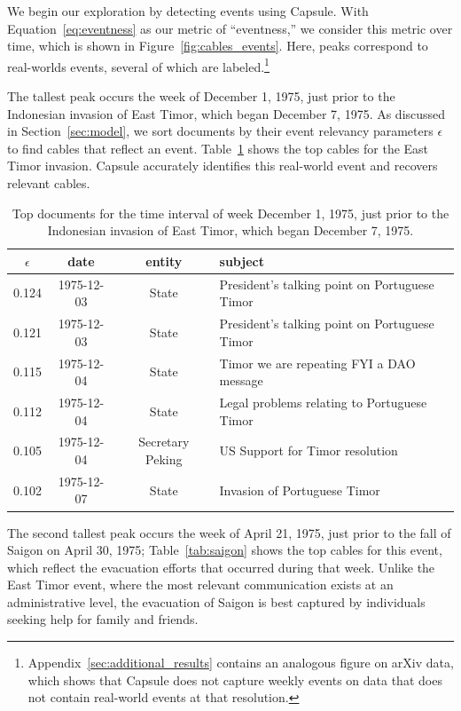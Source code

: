 We begin our exploration by detecting events using Capsule.  With Equation~\ref{eq:eventness} as our metric of ``eventness,'' we consider this metric over time, which is shown in Figure~\ref{fig:cables_events}.  Here, peaks correspond to real-worlds events, several of which are labeled.\footnote{Appendix~\ref{sec:additional_results} contains an analogous figure on arXiv data, which shows that Capsule does not capture weekly events on data that does not contain real-world events at that resolution.}

The tallest peak occurs the week of December 1, 1975, just prior to the Indonesian invasion of East Timor, which began December 7, 1975.  As discussed in Section~\ref{sec:model}, we sort documents by their event relevancy parameters $\epsilon$ to find cables that reflect an event.  Table~\ref{tab:timor} shows the top cables for the East Timor invasion.  Capsule accurately identifies this real-world event and recovers relevant cables.

\begin{table}[tb]
\small
\centering
\begin{tabular}{cccl}
\toprule
$\epsilon$ & date & entity & subject \\
\midrule
0.124   &  1975-12-03  &  State  & President's talking point on Portuguese Timor \\
0.121   &  1975-12-03  &  State  & President's talking point on Portuguese Timor \\
0.115   &  1975-12-04  &  State  & Timor we are repeating FYI a DAO message \\
0.112   &  1975-12-04  &  State  &  Legal problems relating to Portuguese Timor\\
0.105   &  1975-12-04  &  Secretary Peking & US Support for Timor resolution \\
0.102   &  1975-12-07  &  State  & Invasion of Portuguese Timor \\
\bottomrule
\end{tabular}
\label{tab:timor}
\caption{Top documents for the time interval of week December 1, 1975, just prior to the Indonesian invasion of East Timor, which began December 7, 1975.}
\end{table}

The second tallest peak occurs the week of April 21, 1975, just prior to the fall of Saigon on April 30, 1975; Table~\ref{tab:saigon} shows the top cables for this event, which reflect the evacuation efforts that occurred during that week.  Unlike the East Timor event, where the most relevant communication exists at an administrative level, the evacuation of Saigon is best captured by individuals seeking help for family and friends.

